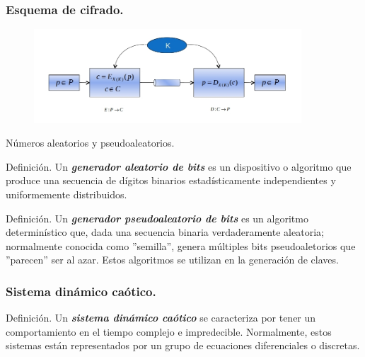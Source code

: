 \documentclass[xcolor=table]{beamer}
\begin{document}
\begin{frame}
\frametitle{Esquema de cifrado.}
\begin{figure}[H]
\centering
\includegraphics[width=10cm]{kakaka.jpg}
\end{figure}
\end{frame}


\begin{frame}{Números aleatorios y pseudoaleatorios.}

\begin{block}{Definición.}
Un \textit{\textbf{generador aleatorio de bits}} es un dispositivo o algoritmo que produce una secuencia de dígitos binarios estadísticamente independientes y uniformemente distribuidos.
\end{block}

\begin{block}{Definición.}
Un \textit{\textbf{generador pseudoaleatorio de bits}} es un algoritmo determinístico que, dada una secuencia binaria verdaderamente aleatoria; normalmente conocida como ''semilla'', genera múltiples bits pseudoaletorios que ''parecen'' ser al azar. Estos algoritmos se utilizan en la generación de claves.
\end{block}
\end{frame}


\begin{frame}
\frametitle{Sistema dinámico caótico.}
\begin{block}{Definición.}
Un \textbf{\textit{sistema dinámico caótico}} se caracteriza por tener un comportamiento en el tiempo complejo e impredecible. Normalmente, estos sistemas están representados por un grupo de ecuaciones diferenciales o discretas.
\end{block}


\end{frame}
\end{document}
